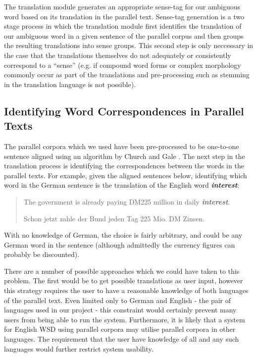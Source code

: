 \documentclass[a4wide,10pt]{article}
\begin{document}
The translation module generates an appropriate sense-tag for our ambiguous 
word based on its translation in the parallel text.  
Sense-tag generation is a two stage process in which the  
translation module first identifies the translation of our ambiguous
word in a given sentence of the parallel corpus and then groups the 
resulting translations into sense groups. This second step is only neccessary 
in the case that the translations themselves do not adequately or 
consistently correspond to a ``sense'' (e.g. if compound word forms or 
complex morphology commonly occur as part of the translations and 
pre-processing such as stemming in the translation language is not possible).


\subsection{Identifying Word Correspondences in Parallel Texts}

The parallel corpora which we used have been pre-processed to be one-to-one 
sentence aligned using an algorithm by Church and Gale \cite{gale91program}. 
The next step in the translation process is identifying the correspondences 
between the words in the parallel texts. For example, given the aligned 
sentences below, identifying which word in the German sentence is the 
translation of the English word {\bf \em interest}:

\begin{quote}
The government is already paying DM225 million in daily {\bf \em interest}.

Schon jetzt zahle der Bund jeden Tag 225 Mio. DM Zinsen. 
\end{quote}

\noindent With no knowledge of German, the choice is fairly arbitrary, 
and could be any German word in the sentence (although admittedly 
the currency figures can probably be discounted). 

There are a number of possible approaches which we could have taken to 
this problem. The first would be to get possible translations as user input, 
however this strategy requires the user to have a reasonable knowledge of 
both languages of the parallel text. Even limited only to German and English -
the pair of languages used in our project - this constraint would certainly 
prevent many users from being able to run the system. Furthermore, it is
likely that a system for English WSD using parallel corpora may utilise 
parallel corpora in other languages. The requirement that the user have 
knowledge of all and any such languages would further restrict system 
usability.
\end{document}
